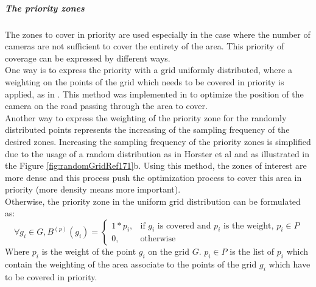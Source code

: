 \subparagraph{The priority zones}
The zones to cover in priority are used especially in the case where the number of cameras are not sufficient to  cover the entirety of the area. This priority of coverage can be expressed by different ways. \\
One way is to express  the priority with a grid uniformly distributed, where a  weighting on the points of the grid which needs to be covered in priority is applied, as in \cite{141*akbarzadeh2013,84*xu2011}.
 This method was implemented in \citep{141*akbarzadeh2013} to optimize the position of the camera on the road passing through the area to cover. \\
Another way to  express the  weighting of the priority zone  for  the randomly distributed points represents the increasing of the sampling frequency of the desired zones. Increasing the sampling frequency of the priority zones is simplified due to the usage of a random distribution as in Horster et al \citep{171*horster2006} and as illustrated in the Figure \ref{fig:randomGridRef171}b.
 Using this method, the zones of interest are more dense and this process push the optimization process to cover this area in priority (more density means more important).\\
Otherwise, the priority zone in the uniform grid distribution can be formulated as: 
 \begin{equation}\label{eq:PciP}
\forall g_i \in G, B^{(p)}(g_i)= \begin{cases} 1*p_i, & \mbox{if } g_i\mbox{ is covered and  $p_i$ is the weight, }p_i \in P  \\ 0, & \mbox{otherwise}  \end{cases}
\end{equation}
Where $p_i$ is the weight of the point $g_i$ on the grid $G$. $p_i \in P $ is the list of $p_i$ which contain the weighting of the area associate to the points of the grid $g_i$ which have to be covered in priority. \\

